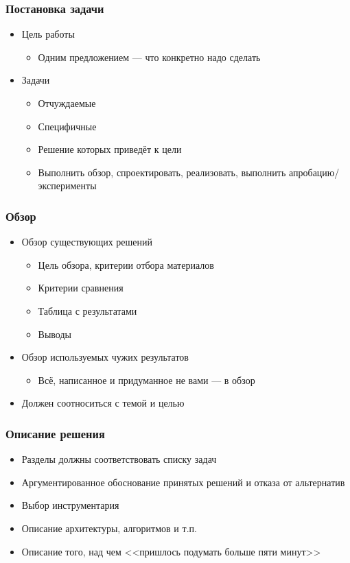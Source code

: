 \documentclass[xetex,mathserif,serif]{beamer}
\begin{document}
    \begin{frame}
        \frametitle{Постановка задачи}
        \begin{itemize}
            \item Цель работы
            \begin{itemize}
                \item Одним предложением --- что конкретно надо сделать
            \end{itemize}
            \item Задачи
            \begin{itemize}
                \item Отчуждаемые
                \item Специфичные
                \item Решение которых приведёт к цели
                \item Выполнить обзор, спроектировать, реализовать, выполнить апробацию/эксперименты
            \end{itemize}
        \end{itemize}
    \end{frame}

    \begin{frame}
        \frametitle{Обзор}
        \begin{itemize}
            \item Обзор существующих решений
            \begin{itemize}
                \item Цель обзора, критерии отбора материалов
                \item Критерии сравнения
                \item Таблица с результатами
                \item Выводы
            \end{itemize}
            \item Обзор используемых чужих результатов
            \begin{itemize}
                \item  Всё, написанное и придуманное не вами --- в обзор
            \end{itemize}
            \item Должен соотноситься с темой и целью
        \end{itemize}
    \end{frame}

    \begin{frame}
        \frametitle{Описание решения}
        \begin{itemize}
            \item Разделы должны соответствовать списку задач
            \item Аргументированное обоснование принятых решений и отказа от альтернатив
            \item Выбор инструментария
            \item Описание архитектуры, алгоритмов и т.п.
            \item Описание того, над чем <<пришлось подумать больше пяти минут>>
        \end{itemize}
    \end{frame}
\end{document}
